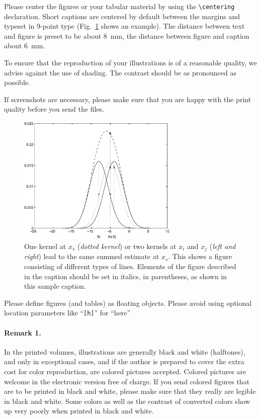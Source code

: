 \documentclass[runningheads,a4paper]{llncs}
\begin{document}
Please center the figures or your tabular material by using the \verb+\centering+
declaration. Short captions are centered by default between the margins
and typeset in 9-point type (Fig.~\ref{fig:example} shows an example).
The distance between text and figure is preset to be about 8~mm, the
distance between figure and caption about 6~mm.

To ensure that the reproduction of your illustrations is of a reasonable
quality, we advise against the use of shading. The contrast should be as
pronounced as possible.

If screenshots are necessary, please make sure that you are happy with
the print quality before you send the files.
\begin{figure}
\centering
\includegraphics[height=6.2cm]{eijkel2}
\caption{One kernel at $x_s$ (\emph{dotted kernel}) or two kernels at
$x_i$ and $x_j$ (\textit{left and right}) lead to the same summed estimate
at $x_s$. This shows a figure consisting of different types of
lines. Elements of the figure described in the caption should be set in
italics, in parentheses, as shown in this sample caption.}
\label{fig:example}
\end{figure}

Please define figures (and tables) as floating objects. Please avoid
using optional location parameters like ``\verb+[h]+'' for ``here''

\paragraph{Remark 1.}

In the printed volumes, illustrations are generally black and white
(halftones), and only in exceptional cases, and if the author is
prepared to cover the extra cost for color reproduction, are colored
pictures accepted. Colored pictures are welcome in the electronic
version free of charge. If you send colored figures that are to be
printed in black and white, please make sure that they really are
legible in black and white. Some colors as well as the contrast of
converted colors show up very poorly when printed in black and white.
\end{document}
